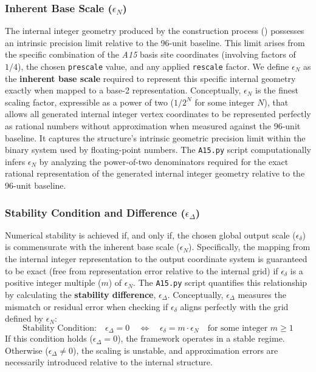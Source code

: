 \documentclass[10pt]{article}
\def\AAAB{\textit{A15}}
\begin{document}
\subsubsection{Inherent Base Scale ($\epsilon_N$)}\label{subsubsec-stability-epsilon-n}
The internal integer geometry produced by the construction process () possesses an intrinsic precision limit relative to the 96-unit baseline. This limit arises from the specific combination of the \AAAB{} basis site coordinates (involving factors of $1/4$), the chosen \texttt{prescale} value, and any applied \texttt{rescale} factor. We define $\epsilon_N$ as the \textbf{inherent base scale} required to represent this specific internal geometry exactly when mapped to a base-2 representation. Conceptually, $\epsilon_N$ is the finest scaling factor, expressible as a power of two ($1/2^N$ for some integer $N$), that allows all generated internal integer vertex coordinates to be represented perfectly as rational numbers without approximation when measured against the 96-unit baseline. It captures the structure's intrinsic geometric precision limit within the binary system used by floating-point numbers. The \texttt{A15.py} script computationally infers $\epsilon_N$ by analyzing the power-of-two denominators required for the exact rational representation of the generated internal integer geometry relative to the 96-unit baseline.

\subsubsection{Stability Condition and Difference ($\epsilon_\Delta$)}\label{subsubsec-stability-diff}
Numerical stability is achieved if, and only if, the chosen global output scale ($\epsilon_\delta$) is commensurate with the inherent base scale ($\epsilon_N$). Specifically, the mapping from the internal integer representation to the output coordinate system is guaranteed to be exact (free from representation error relative to the internal grid) if $\epsilon_\delta$ is a positive integer multiple ($m$) of $\epsilon_N$. The \texttt{A15.py} script quantifies this relationship by calculating the \textbf{stability difference}, $\epsilon_\Delta$. Conceptually, $\epsilon_\Delta$ measures the mismatch or residual error when checking if $\epsilon_\delta$ aligns perfectly with the grid defined by $\epsilon_N$:
\begin{equation}\label{eq-stability-condition}
\text{Stability Condition:} \quad \epsilon_\Delta = 0 \quad \iff \quad \epsilon_\delta = m \cdot \epsilon_N \quad \text{for some integer } m \ge 1
\end{equation}
If this condition holds ($\epsilon_\Delta = 0$), the framework operates in a stable regime. Otherwise ($\epsilon_\Delta \neq 0$), the scaling is unstable, and approximation errors are necessarily introduced relative to the internal structure.
\end{document}
